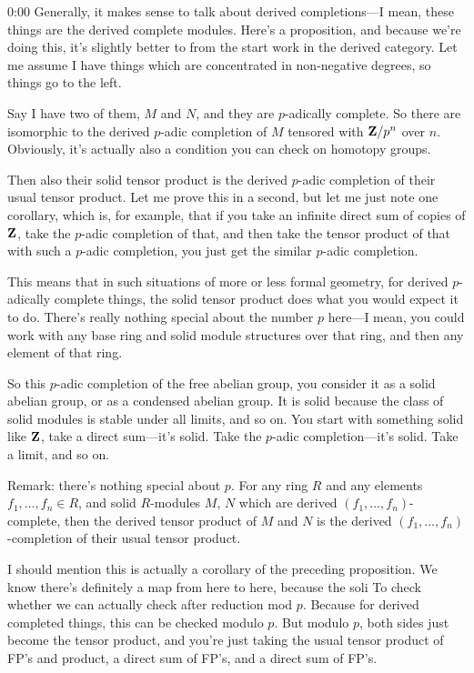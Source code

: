\begin{unfinished}{0:00}
Generally, it makes sense to talk about derived completions---I mean, these things are the derived complete modules. Here's a proposition, and because we're doing this, it's slightly better to from the start work in the derived category. Let me assume I have things which are concentrated in non-negative degrees, so things go to the left.

Say I have two of them, $M$ and $N$, and they are $p$-adically complete. So there are isomorphic to the derived $p$-adic completion of $M$ tensored with $\mathbf Z/p^n$ over $n$. Obviously, it's actually also a condition you can check on homotopy groups.

Then also their solid tensor product is the derived $p$-adic completion of their usual tensor product. Let me prove this in a second, but let me just note one corollary, which is, for example, that if you take an infinite direct sum of copies of $\mathbf Z$, take the $p$-adic completion of that, and then take the tensor product of that with such a $p$-adic completion, you just get the similar $p$-adic completion.

This means that in such situations of more or less formal geometry, for derived $p$-adically complete things, the solid tensor product does what you would expect it to do. There's really nothing special about the number $p$ here---I mean, you could work with any base ring and solid module structures over that ring, and then any element of that ring.

So this $p$-adic completion of the free abelian group, you consider it as a solid abelian group, or as a condensed abelian group. It is solid because the class of solid modules is stable under all limits, and so on. You start with something solid like $\mathbf Z$, take a direct sum---it's solid. Take the $p$-adic completion---it's solid. Take a limit, and so on.

Remark: there's nothing special about $p$. For any ring $R$ and any elements $f_1, \ldots, f_n \in R$, and solid $R$-modules $M$, $N$ which are derived $(f_1, \ldots, f_n)$-complete, then the derived tensor product of $M$ and $N$ is the derived $(f_1, \ldots, f_n)$-completion of their usual tensor product.

I should mention this is actually a corollary of the preceding proposition. We know there's definitely a map from here to here, because the soli
To check whether we can actually check after reduction mod $p$. Because for derived completed things, this can be checked modulo $p$. But modulo $p$, both sides just become the tensor product, and you're just taking the usual tensor product of FP's and product, a direct sum of FP's, and a direct sum of FP's.


\end{unfinished}
